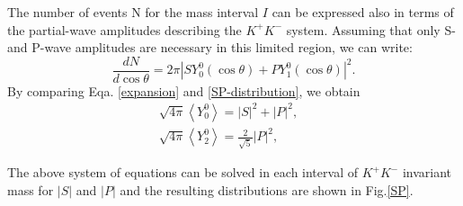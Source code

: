 {    The number of events N for the mass interval $I$ can be expressed also in terms of the partial-wave amplitudes describing the $K^{+}K^{-}$ system. Assuming that only S- and P-wave amplitudes are necessary in this limited region, we can write:
    \begin{equation}
        \frac{dN}{d\cos\theta} = 2\pi\left|SY_{0}^{0}(\cos\theta) + PY_{1}^{0}(\cos\theta)\right|^{2}.\label{SP-distribution}
    \end{equation}
    By comparing Eqa. \ref{expansion} and \ref{SP-distribution}, we obtain 
    \begin{equation}
        \begin{array}{lr}
            \sqrt{4\pi}\left\langle Y_{0}^{0}\right\rangle = \left|S\right|^{2} + \left|P\right|^{2}, &\\ 
            \sqrt{4\pi}\left\langle Y_{2}^{0}\right\rangle = \frac{2}{\sqrt{5}}\left|P\right|^{2}, &
        \end{array}\label{SP-RES} 
    \end{equation}

}


\par{The above system of equations can be solved in each interval of $K^{+}K^{-}$ invariant mass for $\left|S\right|$ and $\left|P\right|$ and the resulting distributions are shown in Fig.\ref{SP}.  
}


